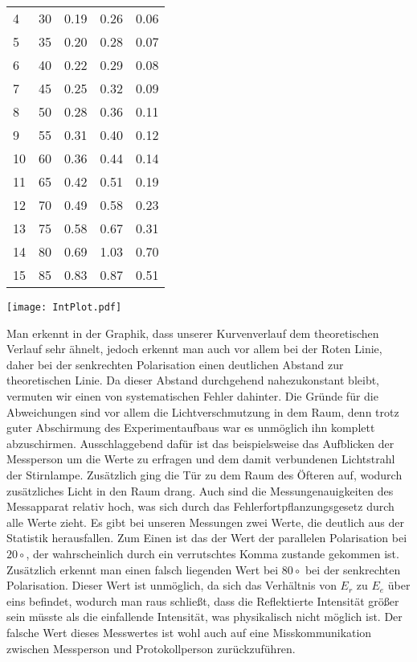 \begin{center}
\begin{tabular}{l | c c c c}
        4  & 30 & 0.19 & 0.26 & 0.06 \\
        5  & 35 & 0.20 & 0.28 & 0.07 \\
        6  & 40 & 0.22 & 0.29 & 0.08 \\
        7  & 45 & 0.25 & 0.32 & 0.09 \\
        8  & 50 & 0.28 & 0.36 & 0.11 \\
        9  & 55 & 0.31 & 0.40 & 0.12 \\
        10 & 60 & 0.36 & 0.44 & 0.14 \\
        11 & 65 & 0.42 & 0.51 & 0.19 \\
        12 & 70 & 0.49 & 0.58 & 0.23 \\
        13 & 75 & 0.58 & 0.67 & 0.31 \\
        14 & 80 & 0.69 & 1.03 & 0.70 \\
        15 & 85 & 0.83 & 0.87 & 0.51 \\
    \end{tabular}
    \texttt{[image: IntPlot.pdf]}
    \captionsetup{justification=centering,margin=2cm}
\end{center}
Man erkennt in der Graphik, dass unserer Kurvenverlauf dem theoretischen Verlauf sehr ähnelt, jedoch erkennt man auch vor allem bei der Roten Linie, daher bei der senkrechten Polarisation einen deutlichen Abstand zur theoretischen Linie. Da dieser Abstand durchgehend nahezukonstant bleibt, vermuten wir einen von systematischen Fehler dahinter.  Die Gründe für die Abweichungen sind vor allem die Lichtverschmutzung in dem Raum, denn trotz guter Abschirmung des Experimentaufbaus war es unmöglich ihn komplett abzuschirmen. Ausschlaggebend dafür ist das beispielsweise das Aufblicken der Messperson um die Werte zu erfragen und dem damit verbundenen Lichtstrahl der Stirnlampe. Zusätzlich ging die Tür zu dem Raum des Öfteren auf, wodurch zusätzliches Licht in den Raum drang.  Auch sind die Messungenauigkeiten des Messapparat relativ hoch, was sich durch das Fehlerfortpflanzungsgesetz durch alle Werte zieht. 
Es gibt bei unseren Messungen zwei Werte, die deutlich aus der Statistik herausfallen. Zum Einen ist das der Wert der parallelen Polarisation bei $20 \circ$, der wahrscheinlich durch ein verrutschtes Komma zustande gekommen ist. Zusätzlich erkennt man einen falsch liegenden Wert bei $80\circ$ bei der senkrechten Polarisation. Dieser Wert ist unmöglich, da sich das Verhältnis von $E_r$ zu $E_e$ über eins befindet, wodurch man raus schließt, dass die Reflektierte Intensität größer sein müsste als die einfallende Intensität, was physikalisch nicht möglich ist. Der falsche Wert dieses Messwertes ist wohl auch auf eine Misskommunikation zwischen Messperson und Protokollperson zurückzuführen.